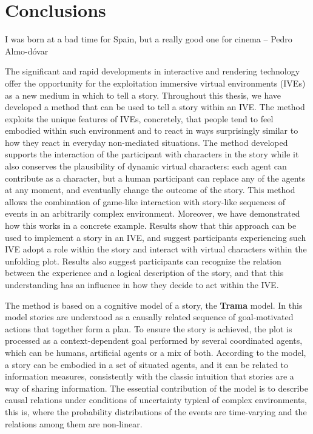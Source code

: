 \documentclass[
		twoside,openright,titlepage,numbers=noenddot,manychapters,
		headinclude,%
                footinclude=false,cleardoublepage=empty,
                BCOR=5mm,
		fontsize=11pt, %
                 enabledeprecatedfontcommands]{scrreprt}
\begin{document}
\cleardoublepage


\chapter{Conclusions}
\thispagestyle{empty}


\begin{origquote}

I was born at a bad time for Spain, but a really good one for cinema -- Pedro Almo-dóvar

\end{origquote}

The significant and rapid developments in interactive and rendering technology offer the opportunity for the exploitation immersive virtual environments (IVEs) as a new medium in which to tell a story. Throughout this thesis,  we have developed a method that can be used to tell a story within an IVE. The method exploits the unique features of IVEs, concretely, that people tend to feel embodied within such environment and to react in ways surprisingly similar to how they react in everyday non-mediated situations. The method developed supports the interaction of the participant with characters in the story while it also conserves the plausibility of dynamic virtual characters: each agent can contribute as a character, but a human participant can  replace any of the agents at any moment, and eventually change the outcome of the story. This method allows the combination of game-like interaction with story-like sequences of events in an arbitrarily complex environment. Moreover, we have demonstrated how this works in a concrete example. Results show that this approach can be used to implement a story in an IVE, and suggest participants experiencing such IVE adopt a role within the story and interact with virtual characters within the unfolding plot. Results also suggest participants can recognize the relation between the experience and a logical description of the story, and that this understanding has an influence in how they decide to act within the IVE. 


The method is based on a cognitive model of a story, the \textbf{Trama} model. In this model stories are understood as a causally related sequence of goal-motivated actions that together form a plan.  To ensure the story is achieved, the plot is processed as a context-dependent goal performed by several coordinated agents, which can be humans, artificial agents or a mix of both.   According to the model, a story can be embodied in a set of situated agents, and it can be related to information measures, consistently with the classic intuition that stories are a way of sharing information. The essential contribution of the model is to describe causal relations under conditions of uncertainty typical of complex environments, this is, where the probability distributions of the events are time-varying and the relations among them are non-linear.
\end{document}
